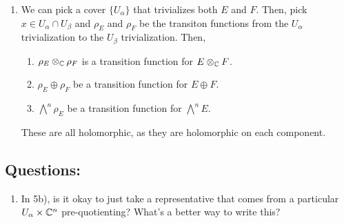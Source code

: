 \documentclass[12pt]{article}
\begin{document}
\begin{solu}
\begin{enumerate}
        \item We can pick a cover $\{U_\alpha\}$ that trivializes both $E$ and $F$. Then, pick $x \in U_\alpha \cap U_\beta$ and $\rho_E$ and $\rho_F$ be the transiton functions from the $U_\alpha$ trivialization to the $U_\beta$ trivialization. Then, 
        \begin{enumerate}
            \item $\rho_E \otimes_\mathbb C \rho_F$ is a transition function for $E \otimes_\mathbb C F$. 
            \item $\rho_E \oplus \rho_F$ be a transition function for $E \oplus F$.
            \item $\bigwedge^n \rho_E$ be a transition function for $\bigwedge^n E$.
        \end{enumerate}
        These are all holomorphic, as they are holomorphic on each component. 
        
    \end{enumerate}
\end{solu}


\subsection*{Questions:}
\begin{enumerate}
    \item In 5b), is it okay to just take a representative that comes from a particular $U_\alpha \times \mathbb C^n$ pre-quotienting? What's a better way to write this?
\end{enumerate}
\end{document}
